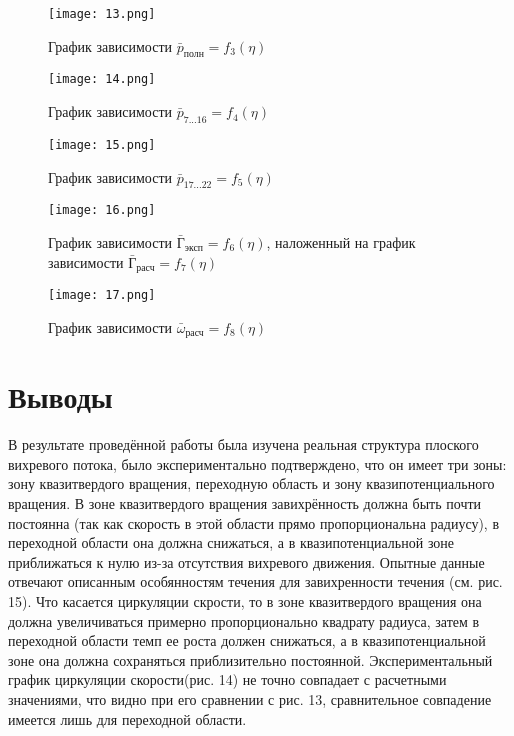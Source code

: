 \documentclass[12pt,a4paper]{article}
\begin{document}
\begin{figure}[h]\center
\texttt{[image: 13.png]}
\caption{График зависимости $\bar p_{\text{полн}}=f_3(\eta) $}\label{fig:3}
\end{figure}

\begin{figure}[h]\center
\texttt{[image: 14.png]}
\caption{График зависимости $\bar p_{\text{7...16}}=f_4(\eta) $}\label{fig:3}
\end{figure}

\begin{figure}[h]\center
\texttt{[image: 15.png]}
\caption{График зависимости $\bar p_{\text{17...22}}=f_5(\eta) $}\label{fig:3}
\end{figure}

\begin{figure}[h]\center
\texttt{[image: 16.png]}
\caption{График зависимости $\bar {\text{Г}}_{\text{эксп}}=f_6(\eta) $, наложенный на график зависимости $\bar {\text{Г}}_{\text{расч}}=f_7(\eta)$}\label{fig:3}
\end{figure}

\begin{figure}[h]\center
\texttt{[image: 17.png]}
\caption{График зависимости $\bar \omega_{\text{расч}}=f_8(\eta) $}\label{fig:3}
\end{figure}

\section{Выводы}
В результате проведённой работы была изучена реальная структура плоского вихревого потока, было экспериментально подтверждено, что он имеет три зоны: зону квазитвердого вращения, переходную область и зону квазипотенциального вращения.
В зоне квазитвердого вращения завихрённость должна быть почти постоянна (так как скорость в этой области прямо пропорциональна радиусу), в переходной области она должна снижаться, а в квазипотенциальной зоне приближаться к нулю из-за отсутствия вихревого движения. Опытные данные отвечают описанным особянностям течения для завихренности течения (см. рис. 15). Что касается циркуляции скрости, то в зоне квазитвердого вращения она должна увеличиваться примерно пропорционально квадрату радиуса, затем в переходной области темп ее роста
должен снижаться, а в квазипотенциальной зоне она должна сохраняться приблизительно постоянной. Экспериментальный график циркуляции скорости(рис. 14) не точно совпадает с расчетными значениями, что видно при его сравнении с рис. 13, сравнительное совпадение имеется лишь для переходной области.
\end{document}
